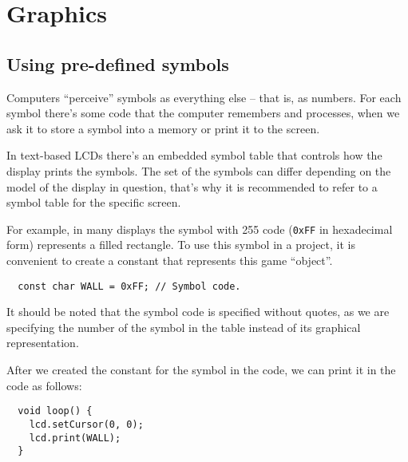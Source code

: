 \documentclass[../sparc.tex]{subfiles}
\begin{document}
\section{Graphics}

\subsection{Using pre-defined symbols}

Computers ``perceive'' symbols as everything else -- that is, as numbers.  For
each symbol there's some code that the computer remembers and processes, when we
ask it to store a symbol into a memory or print it to the screen.


In text-based LCDs there's an embedded symbol table that controls how the
display prints the symbols.  The set of the symbols can differ depending on the
model of the display in question, that's why it is recommended to refer to a
symbol table for the specific screen.

For example, in many displays the symbol with 255 code (\texttt{0xFF}
in hexadecimal form) represents a filled rectangle.  To use this symbol in a
project, it is convenient to create a constant that represents this game
``object''.

\begin{verbatim}
  const char WALL = 0xFF; // Symbol code.
\end{verbatim}

It should be noted that the symbol code is specified without quotes, as we are
specifying the number of the symbol in the table instead of its graphical
representation.

After we created the constant for the symbol in the code, we can print it in the
code as follows:

\begin{verbatim}
  void loop() {
    lcd.setCursor(0, 0);
    lcd.print(WALL);
  }
\end{verbatim}
\end{document}
